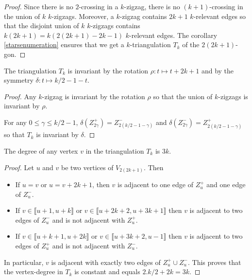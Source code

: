 \documentclass[12pt]{amsart}
\begin{document}
\begin{proof}
Since there is no $2$-crossing in a $k$-zigzag, there is no $(k+1)$-crossing in the union of $k$ $k$-zigzags. Moreover, a $k$-zigzag contains $2k+1$ $k$-relevant edges so that the disjoint union of $k$ $k$-zigzags contains $k(2k+1)=k(2(2k+1)-2k-1)$ $k$-relevant edges. The corollary \ref{starsenumeration} ensures that we get a $k$-triangulation $T_k$ of the $2(2k+1)$-gon.
\end{proof}

\begin{lemma}\label{transformation}
The triangulation $T_k$ is invariant by the rotation $\rho: t\mapsto t+2k+1$ and by the symmetry $\delta: t\mapsto k/2-1-t$.
\end{lemma}

\begin{proof}
Any $k$-zigzag is invariant by the rotation $\rho$ so that the union of $k$-zigzags is invariant by $\rho$.

For any $0\le\gamma\le k/2-1$, $\delta(Z^+_{2\gamma})=Z^-_{2(k/2-1-\gamma)}$ and $\delta(Z^-_{2\gamma})=Z^+_{2(k/2-1-\gamma)}$ so that $T_k$ is invariant by $\delta$.
\end{proof}

\begin{lemma}
The degree of any vertex $v$ in the triangulation $T_k$ is $3k$.
\end{lemma}

\begin{proof}
Let $u$ and $v$ be two vertices of $V_{2(2k+1)}$. Then
\begin{itemize}
\item If $u=v$ or $u=v+2k+1$, then $v$ is adjacent to one edge of $Z_u^+$ and one edge of $Z_u^-$.
\item If $v\in\llbracket u+1,u+k\rrbracket$ or $v\in\llbracket u+2k+2,u+3k+1\rrbracket$ then $v$ is adjacent to two edges of $Z_u^-$ and is not adjacent with $Z_u^+$.
\item If $v\in\llbracket u+k+1,u+2k\rrbracket$ or $v\in\llbracket u+3k+2,u-1\rrbracket$ then $v$ is adjacent to two edges of $Z_u^+$ and is not adjacent with $Z_u^-$.
\end{itemize}
In particular, $v$ is adjacent with exactly two edges of $Z_u^+\cup Z_u^-$. This proves that the vertex-degree in $T_k$ is constant and equals $2.k/2+2k=3k$.
\end{proof}
\end{document}

